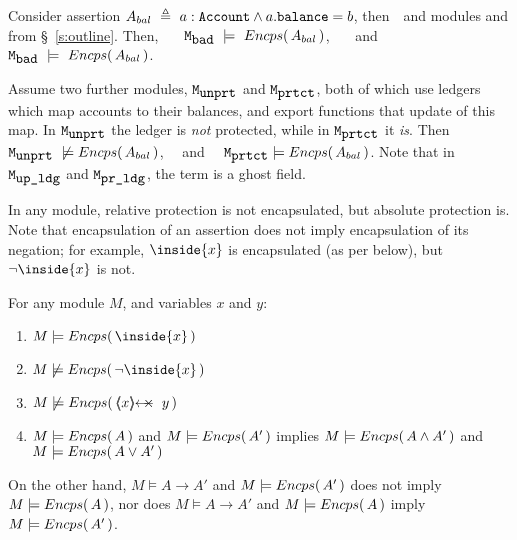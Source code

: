 \renewcommand{\ModD}{\ModParam{unprt}}
\newcommand{\ModE}{\ModParam{prtct}}
\begin{example}
Consider assertion $A_{bal}\  \triangleq\ a:\prg{Account}\wedge a.\prg{balance}=b$, then\ \ and modules \ModB and  \ModC  from \S~\ref{s:outline}. Then, \ \ \ $\mbox{\normalfont{\texttt{M}}}_{\mbox{\normalfont{\texttt{bad}}}}\ \models\ {Encps(\,  A_{bal} \, )}$, \ \ \ and \ \ \ $\mbox{\normalfont{\texttt{M}}}_{\mbox{\normalfont{\texttt{bad}}}}\ \models\ {Encps(\,  A_{bal} \, )}$.

Assume two further modules, $\ModD$ and $\ModE$, both of which  use ledgers which map  accounts to their balances, and export functions that update of this map. In  $\ModD$ the ledger is \emph{not} protected, while in $\ModE$ it \emph{is}. 
Then  \ \ $\ModD \ \not\models\encaps{ A_{bal}} $, \ \  and \ \ $\ModE  \models \encaps{ A_{bal}} $.
\noindent
Note that in $\mbox{\normalfont{\texttt{M}}}_{\mbox{\normalfont{\texttt{up\_ldg}}}}$ and $\mbox{\normalfont{\texttt{M}}}_{\mbox{\normalfont{\texttt{pr\_ldg}}}}$, the term  is a ghost field. 
\end{example}

In any module, relative protection %
is not encapsulated, but  absolute protection is.
 Note  that  encapsulation of an assertion does not imply encapsulation of its negation; 
 for example,  ${\inside{x}}$ is encapsulated (as per below), but $\neg  {\inside{x}}$ is not.


\begin{lemma}
For any module $M$, and variables $x$ and $y$:
\begin{enumerate} 
\item $M \models \encaps{\inside{x}}$
\item $M \not\models {\encaps{\neg\inside{x}}}$
\item $M \not\models {\encaps{\protectedFrom{x}{y}}}$
\item  $M \models  {\ensuremath Encps(\, A\, )}$ and $M \models  {\ensuremath Encps(\, A'\, )}$ implies 
$M \models  {\ensuremath Encps(\, A \wedge A'\, )}$ and $M \models  {\ensuremath Encps(\, A \vee A'\, )}$
\end{enumerate}
\end{lemma}

On the other hand,  $M \models A \rightarrow A'$ and $ M \models  {\ensuremath Encps(\, {A'}\, )}$ does not  imply \ $M \models  {\ensuremath Encps(\, A\, )}$, nor does
$M \models A \rightarrow A'$ and 
 $ M \models  {\ensuremath Encps(\, {A}\, )}$ imply \ $M \models  {\ensuremath Encps(\, A'\, )}$.

